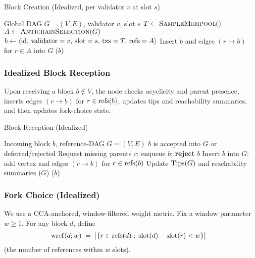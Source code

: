 \begin{algorithm}[H]
\caption{Block Creation (Idealized, per validator $v$ at slot $s$)}
\label{alg:ideal-create}
\begin{algorithmic}[1]
\Require Global DAG $G=(V,E)$, validator $v$, slot $s$
  \State $T \gets \textsc{SampleMempool}()$ 
  \State $A \gets \textsc{AntichainSelection}(G)$
  \State $b \gets \langle \mathrm{id},\,\mathrm{validator}=v,\,\mathrm{slot}=s,\,\mathrm{txs}=T,\,\mathrm{refs}=A\rangle$
  \State Insert $b$ and edges $(r\to b)$ for $r\in A$ into $G$
  \State \Broadcast($b$) 
\EndIf
\end{algorithmic}
\end{algorithm}


\subsubsection{Idealized Block Reception}
Upon receiving a block $b\notin V$, the node checks acyclicity and parent presence, inserts edges $(r\to b)$ for $r\in \mathrm{refs}(b)$,
updates tips and reachability summaries, and then updates fork-choice state.



\begin{algorithm}[H]
\caption{Block Reception (Idealized)}
\label{alg:ideal-reception}
\begin{algorithmic}[1]
\Require Incoming block $b$, reference-DAG $G=(V,E)$
\Ensure $b$ is accepted into $G$ or deferred/rejected
 \Return \EndIf
{}
  \State Request missing parents $r$; enqueue $b$; \Return
\EndIf
{} \textbf{reject} $b$ \EndIf
\State Insert $b$ into $G$: add vertex and edges $(r\to b)$ for $r\in\mathrm{refs}(b)$
\State Update $\mathrm{Tips}(G)$ and reachability summaries
\State \ForkChoiceUpdate($G$) 
\State \Broadcast($b$)
\end{algorithmic}
\end{algorithm}






\subsubsection{Fork Choice (Idealized)}
\label{subsec:alg4}

We use a CCA-anchored, window-filtered weight metric. Fix a window parameter $w\ge1$. For any block $d$, define
\begin{equation*}
\mathrm{wref}(d;w) \;=\; \bigl|\{r\in \mathrm{refs}(d):\,\mathrm{slot}(d)-\mathrm{slot}(r) < w\}\bigr|
\end{equation*}
(the number of references within $w$ slots). 

